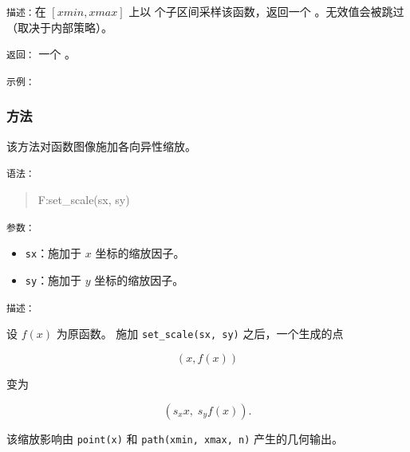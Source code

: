 \texttt{描述：}在 $[xmin,xmax]$ 上以  个子区间采样该函数，返回一个 。无效值会被跳过（取决于内部策略）。

\medskip
\texttt{返回：} 一个 。

\medskip
\texttt{示例：}

\begin{tkzexample}[latex=.5\textwidth]
\end{tkzexample}

%


\subsubsection{方法 }
\label{ssub:method_fct_set_scale}

该方法对函数图像施加各向异性缩放。

\medskip
\texttt{语法：}
\begin{quote}
F:set\_scale(sx, sy)
\end{quote}

\medskip
\texttt{参数：}
\begin{itemize}
\item \texttt{sx}：施加于 $x$ 坐标的缩放因子。
\item \texttt{sy}：施加于 $y$ 坐标的缩放因子。
\end{itemize}

\medskip
\texttt{描述：}

设 $f(x)$ 为原函数。
施加 \texttt{set\_scale(sx, sy)} 之后，一个生成的点

\[
(x, f(x))
\]

变为

\[
(s_x x,\; s_y f(x)).
\]

该缩放影响由 \texttt{point(x)} 和 \texttt{path(xmin, xmax, n)} 产生的几何输出。

